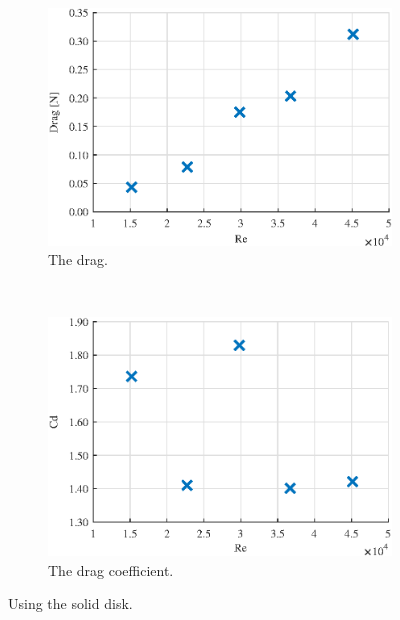 \begin{figure} 
    \centering
    \begin{subfigure}[b]{0.45\linewidth}
        \includegraphics[width=\textwidth]{0_Images/SolidDragRe.eps}
        \caption{The drag.}
        \label{Fig:SolidDrag}
    \end{subfigure}
    ~
    \begin{subfigure}[b]{0.45\linewidth}
        \includegraphics[width=\textwidth]{0_Images/SolidCDRe.eps}
        \caption{The drag coefficient.}
        \label{Fig:SolidCD}
    \end{subfigure}
    \caption{Using the solid disk.}
    \label{fig:SolidDisk}
\end{figure}


